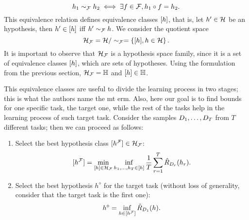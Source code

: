 $$ h_1 \sim_{\mathcal{F}} h_2 \iff \exists f \in \mathcal{F},  h_1 \circ f = h_2 .$$
%
This equivalence relation defines equivalence classes $\lbrack h\rbrack$, that is, let $h' \in \mathcal{H}$ be an hypothesis, then $h' \in \lbrack h\rbrack$ iff $h' \sim_{\mathcal{F}} h$. 
We consider the quotient space 
$$\mathcal{H}_{\mathcal{F}} = \mathcal{H} / \sim_{\mathcal{F}} = \left\{\lbrack h\rbrack, h \in \mathcal{H}\right\}.$$
It is important to observe that $\mathcal{H}_{\mathcal{F}}$ is a hypothesis space family, since it is a set of equivalence classes $\lbrack h\rbrack$, which are sets of hypotheses. Using the formulation from the previous section, $\mathcal{H}_{\mathcal{F}} = \mathbb{H}$ and $\lbrack h\rbrack \in \mathbb{H}$.
%

This equivalence classes are useful to divide the learning process in two stages; this is what the authors name the \acrshort{mt} \acrshort{erm}. 
Also, here our goal is to find bounds for one specific task, the target one, while the rest of the tasks help in the learning process of such target task.
Consider the samples $D_1, \ldots, D_T$ from $T$ different tasks; then we can proceed as follows:
\begin{enumerate}
    \item Select the best hypothesis class $\lbrack h^{\mathcal{F}}\rbrack \in \mathcal{H}_{\mathcal{F}}$:
    \begin{equation}
        \label{eq:first_stage}
        \equivclass{\hypf^\frelset} = \min_{\equivclass{\hypf} \in \hypspace_\frelset} \inf_{\hypf_1, \ldots, \hypf_\ntasks \in \equivclass{\hypf}} \frac{1}{\ntasks} \sum_{r=1}^\ntasks \hat{\risk}_{\sample_r}(\hypf_r) .
    \end{equation}
    \item Select the best hypothesis $h^\diamond$ for the target task (without loss of generality, consider that the target task is the first one):
    \begin{equation}
        \nonumber
        h^\diamond = \inf_{h \in \lbrack h^{\mathcal{F}}\rbrack} \hat{R}_{D_1}(h) .
    \end{equation}
\end{enumerate}


